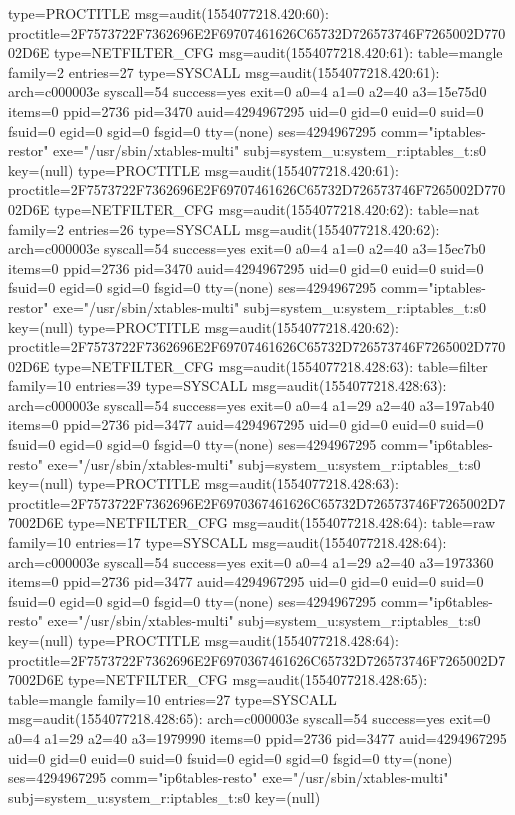\documentclass[]{report}
\newenvironment{Shaded}{}{}
\newcommand{\NormalTok}[1]{#1}
\begin{document}
\begin{Shaded}
\begin{Highlighting}[]
\NormalTok{type=PROCTITLE msg=audit(1554077218.420:60): proctitle=2F7573722F7362696E2F69707461626C65732D726573746F7265002D77002D6E}
\NormalTok{type=NETFILTER_CFG msg=audit(1554077218.420:61): table=mangle family=2 entries=27}
\NormalTok{type=SYSCALL msg=audit(1554077218.420:61): arch=c000003e syscall=54 success=yes exit=0 a0=4 a1=0 a2=40 a3=15e75d0 items=0 ppid=2736 pid=3470 auid=4294967295 uid=0 gid=0 euid=0 suid=0 fsuid=0 egid=0 sgid=0 fsgid=0 tty=(none) ses=4294967295 comm="iptables-restor" exe="/usr/sbin/xtables-multi" subj=system_u:system_r:iptables_t:s0 key=(null)}
\NormalTok{type=PROCTITLE msg=audit(1554077218.420:61): proctitle=2F7573722F7362696E2F69707461626C65732D726573746F7265002D77002D6E}
\NormalTok{type=NETFILTER_CFG msg=audit(1554077218.420:62): table=nat family=2 entries=26}
\NormalTok{type=SYSCALL msg=audit(1554077218.420:62): arch=c000003e syscall=54 success=yes exit=0 a0=4 a1=0 a2=40 a3=15ec7b0 items=0 ppid=2736 pid=3470 auid=4294967295 uid=0 gid=0 euid=0 suid=0 fsuid=0 egid=0 sgid=0 fsgid=0 tty=(none) ses=4294967295 comm="iptables-restor" exe="/usr/sbin/xtables-multi" subj=system_u:system_r:iptables_t:s0 key=(null)}
\NormalTok{type=PROCTITLE msg=audit(1554077218.420:62): proctitle=2F7573722F7362696E2F69707461626C65732D726573746F7265002D77002D6E}
\NormalTok{type=NETFILTER_CFG msg=audit(1554077218.428:63): table=filter family=10 entries=39}
\NormalTok{type=SYSCALL msg=audit(1554077218.428:63): arch=c000003e syscall=54 success=yes exit=0 a0=4 a1=29 a2=40 a3=197ab40 items=0 ppid=2736 pid=3477 auid=4294967295 uid=0 gid=0 euid=0 suid=0 fsuid=0 egid=0 sgid=0 fsgid=0 tty=(none) ses=4294967295 comm="ip6tables-resto" exe="/usr/sbin/xtables-multi" subj=system_u:system_r:iptables_t:s0 key=(null)}
\NormalTok{type=PROCTITLE msg=audit(1554077218.428:63): proctitle=2F7573722F7362696E2F6970367461626C65732D726573746F7265002D77002D6E}
\NormalTok{type=NETFILTER_CFG msg=audit(1554077218.428:64): table=raw family=10 entries=17}
\NormalTok{type=SYSCALL msg=audit(1554077218.428:64): arch=c000003e syscall=54 success=yes exit=0 a0=4 a1=29 a2=40 a3=1973360 items=0 ppid=2736 pid=3477 auid=4294967295 uid=0 gid=0 euid=0 suid=0 fsuid=0 egid=0 sgid=0 fsgid=0 tty=(none) ses=4294967295 comm="ip6tables-resto" exe="/usr/sbin/xtables-multi" subj=system_u:system_r:iptables_t:s0 key=(null)}
\NormalTok{type=PROCTITLE msg=audit(1554077218.428:64): proctitle=2F7573722F7362696E2F6970367461626C65732D726573746F7265002D77002D6E}
\NormalTok{type=NETFILTER_CFG msg=audit(1554077218.428:65): table=mangle family=10 entries=27}
\NormalTok{type=SYSCALL msg=audit(1554077218.428:65): arch=c000003e syscall=54 success=yes exit=0 a0=4 a1=29 a2=40 a3=1979990 items=0 ppid=2736 pid=3477 auid=4294967295 uid=0 gid=0 euid=0 suid=0 fsuid=0 egid=0 sgid=0 fsgid=0 tty=(none) ses=4294967295 comm="ip6tables-resto" exe="/usr/sbin/xtables-multi" subj=system_u:system_r:iptables_t:s0 key=(null)}

\end{Highlighting}
\end{Shaded}
\end{document}
